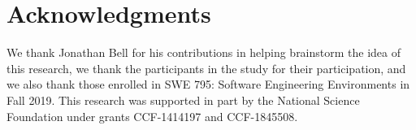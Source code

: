 \documentclass[conference]{IEEEtran}
\begin{document}

\section*{Acknowledgments}
We thank Jonathan Bell for his contributions in helping brainstorm the idea of this research, we thank the participants in the study for their participation, and we also thank those enrolled in SWE 795: Software Engineering Environments in Fall 2019.
This research was supported in part by the National Science Foundation under grants CCF-1414197 and CCF-1845508.



\end{document}
